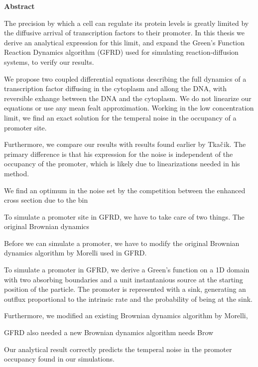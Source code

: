 \begin{center}
{\center \bf Abstract}
\end{center}

The precision by which a cell can regulate its protein levels is greatly limited by the diffusive arrival of transcription factors to their promoter. In this thesis we derive an analytical expression for this limit, and expand the Green's Function Reaction Dynamics algorithm (GFRD) used for simulating reaction-diffusion systems, to verify our results.

We propose two coupled differential equations describing the full dynamics of a transcription factor diffusing in the cytoplasm and allong the DNA, with reversible exhange between the DNA and the cytoplasm. We do not linearize our equations or use any mean fealt approximation. Working in the low concentration limit, we find an exact solution for the temperal noise in the occupancy of a promoter site. 

Furthermore, we compare our results with results found earlier by Tka$\check{\rm c}$ik. The primary difference is that his expression for the noise is independent of the occupancy of the promoter, which is likely due to linearizations needed in his method.


We find an optimum in the noise set by the competition between the enhanced cross section due to the bin 

To simulate a promoter site in GFRD, we have to take care of two things. The original Brownian dynamics 


Before we can simulate a promoter, we have to modify the original Brownian dynamics algorithm by Morelli used in GFRD. 





To simulate a promoter in GFRD, we derive a Green's function on a 1D domain with two absorbing boundaries and a unit instantanious source at the starting position of the particle. The promoter is represented with a sink, generating an outflux proportional to the intrinsic rate and the probability of being at the sink. 

Furthermore, we modified an existing Brownian dynamics algorithm by Morelli, 


GFRD also needed a new Brownian dynamics algorithm needs Brow  





Our analytical result correctly predicts the temperal noise in the promoter occupancy found in our simulations.

